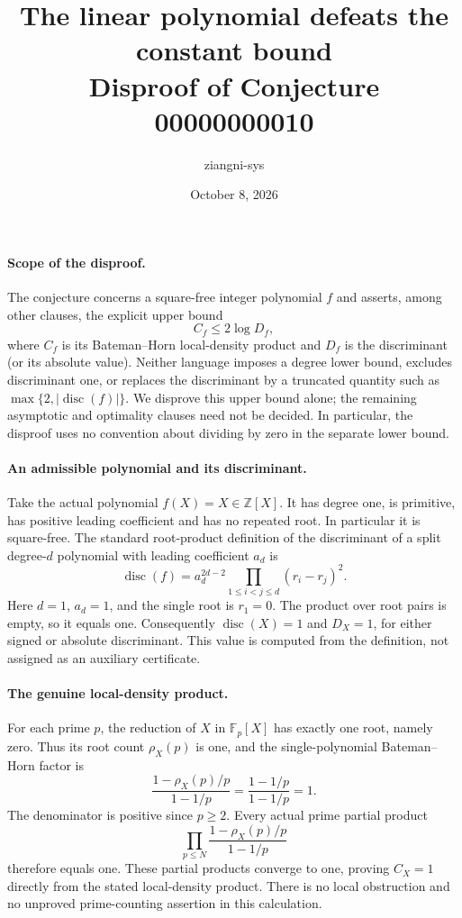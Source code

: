 \documentclass[11pt]{article}
\title{The linear polynomial defeats the constant bound\\Disproof of Conjecture 00000000010}
\author{ziangni-sys}
\date{October 8, 2026}
\begin{document}
\maketitle
\paragraph{Scope of the disproof.}
The conjecture concerns a square-free integer polynomial $f$ and asserts,
among other clauses, the explicit upper bound
\[
 C_f\leq2\log D_f,
\]
where $C_f$ is its Bateman--Horn local-density product and $D_f$ is the
discriminant (or its absolute value). Neither language imposes a degree
lower bound, excludes discriminant one, or replaces the discriminant
by a truncated quantity such as $\max\{2,|\operatorname{disc}(f)|\}$.
We disprove this upper bound alone; the remaining asymptotic and
optimality clauses need not be decided. In particular, the disproof
uses no convention about dividing by zero in the separate lower bound.

\paragraph{An admissible polynomial and its discriminant.}
Take the actual polynomial $f(X)=X\in\mathbb Z[X]$. It has degree one,
is primitive, has positive leading coefficient and has no repeated root.
In particular it is square-free. The standard root-product definition
of the discriminant of a split degree-$d$ polynomial with leading
coefficient $a_d$ is
\[
 \operatorname{disc}(f)=a_d^{2d-2}
     \prod_{1\leq i<j\leq d}(r_i-r_j)^2.
\]
Here $d=1$, $a_d=1$, and the single root is $r_1=0$. The product over
root pairs is empty, so it equals one. Consequently
$\operatorname{disc}(X)=1$ and $D_X=1$, for either signed or absolute
discriminant. This value is computed from the definition, not assigned
as an auxiliary certificate.

\paragraph{The genuine local-density product.}
For each prime $p$, the reduction of $X$ in $\mathbb F_p[X]$ has exactly
one root, namely zero. Thus its root count $\rho_X(p)$ is one, and the
single-polynomial Bateman--Horn factor is
\[
 \frac{1-\rho_X(p)/p}{1-1/p}
   =\frac{1-1/p}{1-1/p}=1.
\]
The denominator is positive since $p\geq2$. Every actual prime partial
product
\[
 \prod_{p\leq N}\frac{1-\rho_X(p)/p}{1-1/p}
\]
therefore equals one.
These partial products converge to one, proving $C_X=1$ directly from
the stated local-density product. There is no local obstruction and
no unproved prime-counting assertion in this calculation.
\end{document}
